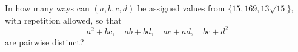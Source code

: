 In how many ways can $(a,b,c,d)$ be assigned values from $\{15,169,13\sqrt{15}\}$, with repetition allowed, so that
\[
a^2+bc,\quad ab+bd,\quad ac+ad,\quad bc+d^2
\]
are pairwise distinct?
